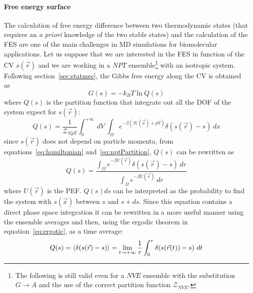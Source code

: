 \paragraph{\textbf{Free energy surface}} The calculation of free energy difference between two thermodynamic
states (that requires an \textit{a priori} knowledge of the two stable states) and the calculation of the
\ac{FES} are one of the main challenges in \ac{MD} simulations for biomolecular applications. Let us suppose that
we are interested in the \ac{FES} in function of the \ac{CV} $s(\vec r)$ and we are working in a $NPT$
ensemble\footnote{The following is still valid even for a $NVE$ ensemble with the substitution $G\rightarrow A$
and the use of the correct partition function $\mathcal{Z}_{NVE}$.} with an isotropic system. Following
section~\ref{sec:statmec}, the Gibbs free energy along the \ac{CV} is obtained as
\begin{equation}
	G(s) = -k_BT \ln Q(s)
	\label{eq:fes}
\end{equation}
where $Q(s)$ is the partition function that integrate out all the \ac{DOF} of the system expect for $s(\vec r)$:
\begin{equation*}
	Q(s) = \frac{1}{\mathcal{Z}_{NpT}} \int_0^{+\infty}\ dV \ \int_\Omega e^{-\beta(\mathcal{H}(\vec x) + pV)}\delta(s(\vec r) - s)\ dx
\end{equation*}
since $s(\vec r)$ does not depend on particle momenta, from equations~\eqref{eq:hamiltonian}
and~\eqref{eq:nptPartition}, $Q(s)$ can be rewritten as
\begin{equation}
	Q(s) =  \frac{ \int_\Omega e^{-\beta U(\vec r)}\delta(s(\vec r) - s)\ dr }{\int_\Omega e^{-\beta U(\vec r)}\ dr}
	\label{eq:CVprobability}
\end{equation}
where $U(\vec r)$ is the \ac{PEF}. $Q(s)ds$ can be interpreted as the probability to find the system with
$s(\vec x)$ between $s$ and $s + ds$. Since this equation contains a direct phase space integration it can be
rewritten in a more useful manner using the ensemble averages and then, using the ergodic theorem in
equation~\eqref{eq:ergotic}, as a time average:
\begin{equation}
	Q(s) = \left \langle \delta(s(\vec r) - s) \right \rangle = \lim_{t\to +\infty}\frac{1}{\tau}\int_0^\tau \delta(s(\vec r(t)) - s)\ dt
	\label{eq:CVprobabilityAve}
\end{equation}

